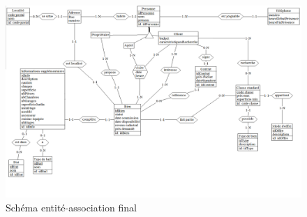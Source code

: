 \newpage
\begin{landscape}
	\begin{figure}
		\centering
		\includegraphics[width=25cm]{association.png}
		\caption{Schéma entité-association final}
		\label{fig:ea}
	\end{figure}
\end{landscape}

